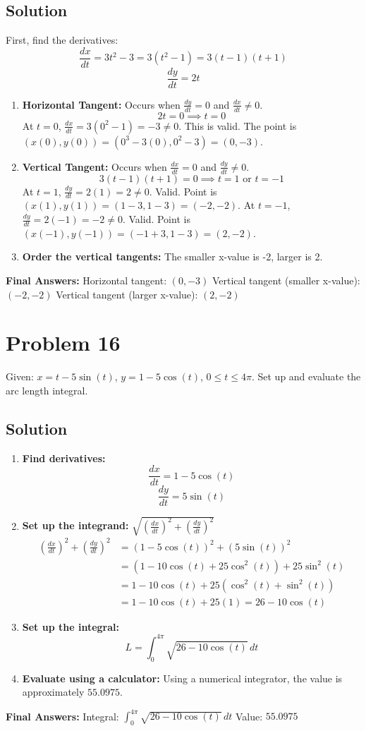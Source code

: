 \documentclass{article}
\begin{document}
\subsection*{Solution}
First, find the derivatives:
\[ \frac{dx}{dt} = 3t^2 - 3 = 3(t^2-1) = 3(t-1)(t+1) \]
\[ \frac{dy}{dt} = 2t \]
\begin{enumerate}
    \item \textbf{Horizontal Tangent:} Occurs when $\frac{dy}{dt}=0$ and $\frac{dx}{dt} \neq 0$.
    \[ 2t = 0 \implies t=0 \]
    At $t=0$, $\frac{dx}{dt} = 3(0^2 - 1) = -3 \neq 0$. This is valid.
    The point is $(x(0), y(0)) = (0^3 - 3(0), 0^2 - 3) = (0, -3)$.
    \item \textbf{Vertical Tangent:} Occurs when $\frac{dx}{dt}=0$ and $\frac{dy}{dt} \neq 0$.
    \[ 3(t-1)(t+1) = 0 \implies t=1 \text{ or } t=-1 \]
    At $t=1$, $\frac{dy}{dt} = 2(1) = 2 \neq 0$. Valid. Point is $(x(1), y(1)) = (1-3, 1-3) = (-2, -2)$.
    At $t=-1$, $\frac{dy}{dt} = 2(-1) = -2 \neq 0$. Valid. Point is $(x(-1), y(-1)) = (-1+3, 1-3) = (2, -2)$.
    \item \textbf{Order the vertical tangents:} The smaller x-value is -2, larger is 2.
\end{enumerate}
\textbf{Final Answers:}
Horizontal tangent: $(0, -3)$
Vertical tangent (smaller x-value): $(-2, -2)$
Vertical tangent (larger x-value): $(2, -2)$

\section{Problem 16}
Given: $x = t - 5\sin(t)$, $y = 1 - 5\cos(t)$, $0 \le t \le 4\pi$. Set up and evaluate the arc length integral.

\subsection*{Solution}
\begin{enumerate}
    \item \textbf{Find derivatives:}
    \[ \frac{dx}{dt} = 1 - 5\cos(t) \]
    \[ \frac{dy}{dt} = 5\sin(t) \]
    \item \textbf{Set up the integrand:} $\sqrt{(\frac{dx}{dt})^2 + (\frac{dy}{dt})^2}$
    \begin{align*}
    (\frac{dx}{dt})^2 + (\frac{dy}{dt})^2 &= (1 - 5\cos(t))^2 + (5\sin(t))^2 \\
    &= (1 - 10\cos(t) + 25\cos^2(t)) + 25\sin^2(t) \\
    &= 1 - 10\cos(t) + 25(\cos^2(t) + \sin^2(t)) \\
    &= 1 - 10\cos(t) + 25(1) = 26 - 10\cos(t)
    \end{align*}
    \item \textbf{Set up the integral:}
    \[ L = \int_{0}^{4\pi} \sqrt{26 - 10\cos(t)} \, dt \]
    \item \textbf{Evaluate using a calculator:}
    Using a numerical integrator, the value is approximately $55.0975$.
\end{enumerate}
\textbf{Final Answers:}
Integral: $\displaystyle \int_{0}^{4\pi} \sqrt{26 - 10\cos(t)} \, dt$
Value: $55.0975$
\end{document}
